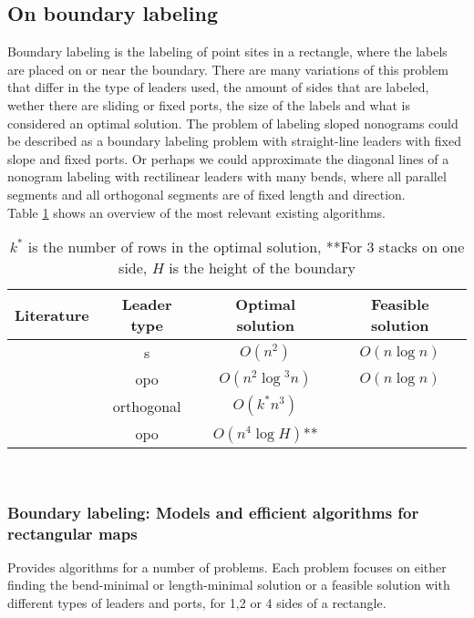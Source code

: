 \documentclass[a4paper]{article}
\begin{document}
\subsection{On boundary labeling}
Boundary labeling is the labeling of point sites in a rectangle, where the labels are placed on or near the boundary. There are many variations of this problem that differ in the type of leaders used, the amount of sides that are labeled, wether there are sliding or fixed ports, the size of the labels and what is considered an optimal solution. The problem of labeling sloped nonograms could be described as a boundary labeling problem with straight-line leaders with fixed slope and fixed ports. Or perhaps we could approximate the diagonal lines of a nonogram labeling with rectilinear leaders with many bends, where all parallel segments and all orthogonal segments are of fixed length and direction.\\
Table \ref{tab:overview} shows an overview of the most relevant existing algorithms. \\

\begin{table}[t]
\centering
\begin{tabular}{ |c|c|c|c| }
\hline
  Literature & Leader type &  Optimal solution & Feasible solution \\
\hline
  \cite{bekos2007boundary} & s & $O(n^2)$ & $O(n\log{}n)$ \\
 \cite{bekos2007boundary} & opo &  $O(n^2\log{^3}n)$ & $O(n\log{}n)$ \\
\cite{Gemsa:2011:BAP:2093973.2094012} & orthogonal & $O(k^*n^3)$& \\ 
\cite{bekos2006multi} & opo & $O(n^4 \log{}H)$**&\\
\hline
\end{tabular}\\
\caption{$k^*$ is the number of rows in the optimal solution, **For 3 stacks on one side, $H$ is the height of the boundary}
\label{tab:overview}
\end{table}


\subsubsection{Boundary labeling: Models and efficient algorithms for rectangular maps \cite{bekos2007boundary}}
Provides algorithms for a number of problems. Each problem focuses on either finding the bend-minimal or length-minimal solution or a feasible solution with different types of leaders and ports, for 1,2 or 4 sides of a rectangle.
\end{document}
